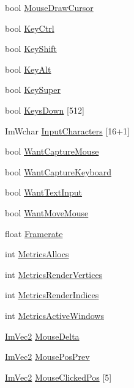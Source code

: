 \begin{DoxyCompactItemize}
\item 
bool \hyperlink{struct_im_gui_i_o_a9b240460966bf2bd35c30f27b8db4028}{Mouse\+Draw\+Cursor}
\item 
bool \hyperlink{struct_im_gui_i_o_a51de8f65dcabb80ef4e0d3c759ffcd7f}{Key\+Ctrl}
\item 
bool \hyperlink{struct_im_gui_i_o_a3c7642214f88862af5b8467f98ac35c9}{Key\+Shift}
\item 
bool \hyperlink{struct_im_gui_i_o_a1e64ef08a4448a2cac874496130992cb}{Key\+Alt}
\item 
bool \hyperlink{struct_im_gui_i_o_afda9e11e21b7ba21573671c38d9f4a81}{Key\+Super}
\item 
bool \hyperlink{struct_im_gui_i_o_a182f42d74cb25a4cf611cc0f776b3848}{Keys\+Down} \mbox{[}512\mbox{]}
\item 
Im\+Wchar \hyperlink{struct_im_gui_i_o_af6283418a2bff9db1522a6245476c7ed}{Input\+Characters} \mbox{[}16+1\mbox{]}
\item 
bool \hyperlink{struct_im_gui_i_o_af5b8add76c5d833a65df19b5456acd7e}{Want\+Capture\+Mouse}
\item 
bool \hyperlink{struct_im_gui_i_o_a458e4ca98d896adb16e3a41ec6d2b811}{Want\+Capture\+Keyboard}
\item 
bool \hyperlink{struct_im_gui_i_o_a0e53197e96187a57b2d86720bf163f4d}{Want\+Text\+Input}
\item 
bool \hyperlink{struct_im_gui_i_o_a0bd366ca18e78bf58f674a355189eaf3}{Want\+Move\+Mouse}
\item 
float \hyperlink{struct_im_gui_i_o_a8c6c2be54ddeda3cfb4a73cf95701a54}{Framerate}
\item 
int \hyperlink{struct_im_gui_i_o_a9d17ce57fff7919f3ca1584c2186daaf}{Metrics\+Allocs}
\item 
int \hyperlink{struct_im_gui_i_o_a8ec9d203f4543047a8820366c5734529}{Metrics\+Render\+Vertices}
\item 
int \hyperlink{struct_im_gui_i_o_a19daed6a7fa22819fe187dfc2a2f5683}{Metrics\+Render\+Indices}
\item 
int \hyperlink{struct_im_gui_i_o_ae47a71018cc9b0c7b55912a4bfa9149c}{Metrics\+Active\+Windows}
\item 
\hyperlink{struct_im_vec2}{Im\+Vec2} \hyperlink{struct_im_gui_i_o_a5b5cc0c171104337e3e7e13a8f7b0938}{Mouse\+Delta}
\item 
\hyperlink{struct_im_vec2}{Im\+Vec2} \hyperlink{struct_im_gui_i_o_a0fa6601a709eb9e34460e6abc7e77ad7}{Mouse\+Pos\+Prev}
\item 
\hyperlink{struct_im_vec2}{Im\+Vec2} \hyperlink{struct_im_gui_i_o_a23c9c6c48a51774fee36b7f0bb75d331}{Mouse\+Clicked\+Pos} \mbox{[}5\mbox{]}

\end{DoxyCompactItemize}
